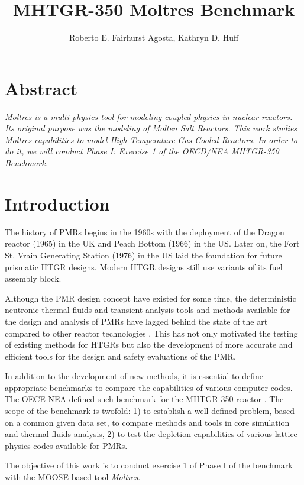 \documentclass{anstrans}
\title{MHTGR-350 Moltres Benchmark}
\author{Roberto E. Fairhurst Agosta, Kathryn D. Huff}
\institute{
University of Illinois at Urbana-Champaign, Dept. of Nuclear, Plasma, and Radiological Engineering\\
ref3@illinois.edu
}
\begin{document}

\section{Abstract}

\textit{
Moltres is a multi-physics tool for modeling coupled physics in nuclear reactors.
Its original purpose was the modeling of Molten Salt Reactors.
This work studies Moltres capabilities to model High Temperature Gas-Cooled Reactors.
In order to do it, we will conduct Phase I: Exercise 1 of the OECD/NEA MHTGR-350 Benchmark.
}

\section{Introduction}

The history of \glspl{PMR} begins in the 1960s with the deployment of the Dragon reactor (1965) in the \gls{UK} and Peach Bottom (1966) in the \gls{US}.
Later on, the Fort St. Vrain Generating Station (1976) in the \gls{US} laid the foundation for future prismatic \gls{HTGR} designs.
Modern \gls{HTGR} designs still use variants of its fuel assembly block.

Although the \gls{PMR} design concept have existed for some time, the deterministic neutronic thermal-fluids and transient analysis tools and methods available for the  design and analysis of \glspl{PMR} have lagged behind the state of the art compared to other reactor technologies \cite{oecd_nea_benchmark_2017}.
This has not only motivated the testing of existing methods for \glspl{HTGR} but also the development of more accurate and efficient tools for the design and safety evaluations of the \gls{PMR}.

In addition to the development of new methods, it is essential to define appropriate benchmarks to compare the capabilities of various computer codes.
The OECE \gls{NEA} defined such benchmark for the MHTGR-350 reactor \cite{oecd_nea_benchmark_2017}.
The scope of the benchmark is twofold: 1) to establish a well-defined problem, based on a common given data set, to compare methods and tools in core simulation and thermal fluids analysis, 2) to test the depletion capabilities of various lattice physics codes available for \glspl{PMR}.

The objective of this work is to conduct exercise 1 of Phase I of the benchmark with the \gls{MOOSE} \cite{gaston_physics-based_2015} based tool \textit{Moltres}\cite{lindsay_introduction_2018}.
\end{document}
